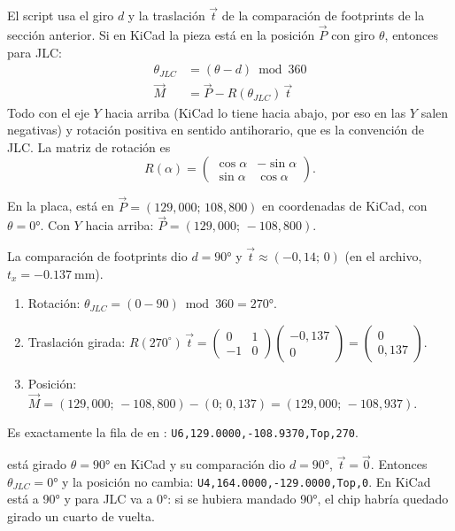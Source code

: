 El script  usa el giro $d$ y la traslación $\vec t$ de la comparación de footprints de la sección anterior. Si en KiCad la pieza está en la posición $\vec P$ con giro $\theta$, entonces para JLC:
\begin{align}
\theta_{JLC} &= (\theta - d) \bmod 360 \label{eq:c05-rot}\\
\vec M &= \vec P - R(\theta_{JLC})\,\vec t \label{eq:c05-pos}
\end{align}
Todo con el eje $Y$ hacia arriba (KiCad lo tiene hacia abajo, por eso en  las $Y$ salen negativas) y rotación positiva en sentido antihorario, que es la convención de JLC. La matriz de rotación es
\[
R(\alpha)=\begin{pmatrix}\cos\alpha & -\sin\alpha\\ \sin\alpha & \cos\alpha\end{pmatrix}.
\]

\begin{calculo}
En la placa,  está en $\vec P=(129{,}000;\,108{,}800)$ en coordenadas de KiCad, con $\theta=\ang{0}$. Con $Y$ hacia arriba: $\vec P=(129{,}000;\,-108{,}800)$.

La comparación de footprints dio $d=\ang{90}$ y $\vec t\approx(-0{,}14;\,0)$ (en el archivo, $t_x=\SI{-0.137}{\milli\meter}$).
\begin{enumerate}
  \item Rotación: $\theta_{JLC}=(0-90)\bmod 360=\ang{270}$.
  \item Traslación girada: $R(270^\circ)\,\vec t=\begin{pmatrix}0 & 1\\ -1 & 0\end{pmatrix}\begin{pmatrix}-0{,}137\\0\end{pmatrix}=\begin{pmatrix}0\\0{,}137\end{pmatrix}$.
  \item Posición: $\vec M=(129{,}000;\,-108{,}800)-(0;\,0{,}137)=(129{,}000;\,-108{,}937)$.
\end{enumerate}
Es exactamente la fila de  en : \texttt{U6,129.0000,-108.9370,Top,270}.
\end{calculo}

\begin{calculo}
 está girado $\theta=\ang{90}$ en KiCad y su comparación dio $d=\ang{90}$, $\vec t=\vec 0$. Entonces $\theta_{JLC}=\ang{0}$ y la posición no cambia: \texttt{U4,164.0000,-129.0000,Top,0}. En KiCad está a \ang{90} y para JLC va a \ang{0}: si se hubiera mandado \ang{90}, el chip habría quedado girado un cuarto de vuelta.
\end{calculo}


